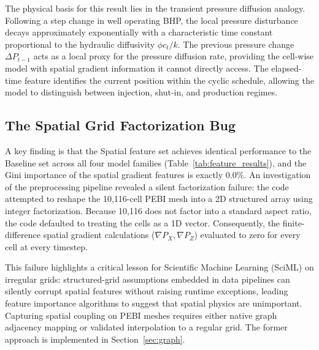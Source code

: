 The physical basis for this result lies in the transient pressure diffusion analogy. Following a step change in well operating BHP, the local pressure disturbance decays approximately exponentially with a characteristic time constant proportional to the hydraulic diffusivity $\phi c_t / k$. The previous pressure change $\Delta P_{t-1}$ acts as a local proxy for the pressure diffusion rate, providing the cell-wise model with spatial gradient information it cannot directly access. The elapsed-time feature identifies the current position within the cyclic schedule, allowing the model to distinguish between injection, shut-in, and production regimes.

\subsection{The Spatial Grid Factorization Bug} \label{sec:grid_bug}
A key finding is that the Spatial feature set achieves identical performance to the Baseline set across all four model families (Table~\ref{tab:feature_results}), and the Gini importance of the spatial gradient features is exactly 0.0\%. An investigation of the preprocessing pipeline revealed a silent factorization failure: the code attempted to reshape the 10,116-cell PEBI mesh into a 2D structured array using integer factorization. Because 10,116 does not factor into a standard aspect ratio, the code defaulted to treating the cells as a 1D vector. Consequently, the finite-difference spatial gradient calculations ($\nabla P_X, \nabla P_Z$) evaluated to zero for every cell at every timestep.

This failure highlights a critical lesson for Scientific Machine Learning (SciML) on irregular grids: structured-grid assumptions embedded in data pipelines can silently corrupt spatial features without raising runtime exceptions, leading feature importance algorithms to suggest that spatial physics are unimportant. Capturing spatial coupling on PEBI meshes requires either native graph adjacency mapping or validated interpolation to a regular grid. The former approach is implemented in Section~\ref{sec:graph}.

